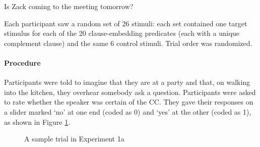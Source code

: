 \documentclass[11pt,fleqn]{article}
\newcommand{\6}{\mbox{$[\hspace*{-.6mm}[$}}
\newcommand{\9}{\mbox{$]\hspace*{-.6mm}]$}}
\begin{document}
\begin{exe}
\ex\label{control} Is Zack coming to the meeting tomorrow?
\end{exe}


Each participant saw a random set of 26 stimuli: each set contained one target stimulus for each of the 20 clause-embedding predicates (each with a unique complement clause) and the same 6 control stimuli. Trial order was randomized.

\paragraph{Procedure} Participants were told to imagine that they are at a party and that, on walking into the kitchen, they overhear somebody ask a question. Participants were asked to rate whether the speaker was certain of the CC. They gave their responses on a slider marked `no' at one end (coded as 0) and `yes' at the other (coded as 1), as shown in Figure \ref{fig-trial-exp1}.

\begin{figure}[h!]
\begin{center}
\end{center}
\caption{A sample trial in Experiment 1a}\label{fig-trial-exp1}
\end{figure}
\end{document}
